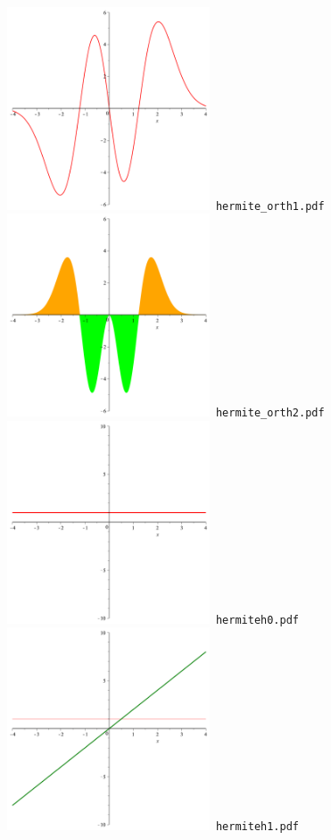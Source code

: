 \documentclass[a4paper]{amsart}
\begin{document}
\includegraphics[width=6cm]{hermite_orth1.pdf}\verb+ hermite_orth1.pdf+\\
\includegraphics[width=6cm]{hermite_orth2.pdf}\verb+ hermite_orth2.pdf+\\
\includegraphics[width=6cm]{hermiteh0.pdf}\verb+ hermiteh0.pdf+\\
\includegraphics[width=6cm]{hermiteh1.pdf}\verb+ hermiteh1.pdf+\\
\end{document}
